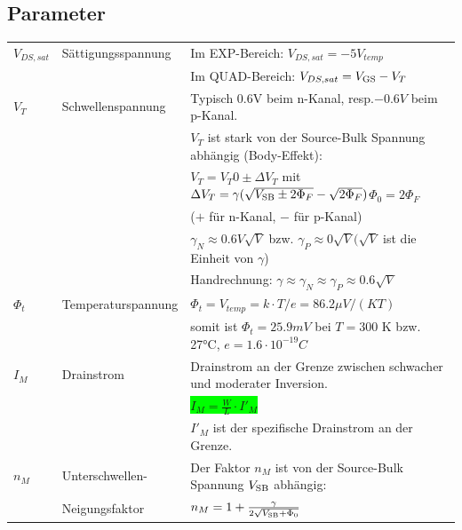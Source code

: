 \subsection{Parameter}
\begin{tabular}{| l | l | l |}
    \hline
    $V_{DS,sat}$    & Sättigungsspannung    & Im EXP-Bereich: $V_{DS,sat} = -5 V_{temp}$\\
                    &                       & Im QUAD-Bereich: $V_{DS,sat} = V_{\rm GS} - V_T$\\
    \hline
    $V_T$           & Schwellenspannung     & Typisch 0.6V beim n-Kanal, resp.$-0.6V$ beim p-Kanal.\\
                    &                       & $V_T$ ist stark von der Source-Bulk Spannung abhängig (Body-Effekt):\\
                    &                       & $V_T = V_T0 \pm \Delta V_T$ mit $\Delta V_T = \gamma(\sqrt{V_{\rm SB}\pm 2\Phi_F}-\sqrt{2\Phi_F})$\hspace{10pt}$\Phi_0 = 2\Phi_F$ \\ 
                    &                       & ($+$ für n-Kanal, $-$ für p-Kanal)\\
                    &                       & $\gamma_N \approx 0.6V\sqrt{V}$ bzw. $\gamma_P \approx 0\sqrt{V} (\sqrt{V}$ ist die Einheit von $\gamma$)\\
                    &                       & Handrechnung: $\gamma \approx\gamma_N \approx\gamma_P\approx 0.6\sqrt{V}$ \\
    \hline
    $\Phi_t$        & Temperaturspannung    & $\Phi_t = V_{temp} = k\cdot T/e = 86.2\mu V/(K T)$ \\
                    &                       & somit ist $\Phi_t = 25.9 mV$ bei $T = 300$ K bzw. 27°C, $e = 1.6\cdot 10^{-19}C$\\
    \hline
    $I_M$           & Drainstrom            & Drainstrom an der Grenze zwischen schwacher und moderater Inversion. \\
                    &                       & \colorbox{lime}{$I_M = \frac{W}{L}\cdot I'_M$} \\
                    &                       & $I'_M$ ist der spezifische Drainstrom an der Grenze. \\
    \hline
    $n_M$           & Unterschwellen-       & Der Faktor $n_M$ ist von der Source-Bulk Spannung $V_{\rm SB}$ abhängig:\\
                    & Neigungsfaktor        & $n_M = 1 + \frac{\gamma}{2\sqrt{V_{\rm SB}+\Phi_0}}$\\

\end{tabular}
